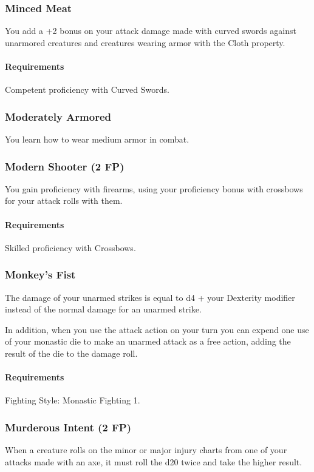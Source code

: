 \subsubsection{Minced Meat} \label{feat::mincedmeat}
    You add a +2 bonus on your attack damage made with curved swords against unarmored creatures and creatures wearing armor with the Cloth property.
    \paragraph{Requirements} Competent proficiency with Curved Swords.
\subsubsection{Moderately Armored} \label{feat::moderatelyarmored}
    You learn how to wear medium armor in combat.
\subsubsection{Modern Shooter (2 FP)} \label{feat::modernshooter}
    You gain proficiency with firearms, using your proficiency bonus with crossbows for your attack rolls with them.
    \paragraph{Requirements} Skilled proficiency with Crossbows.
\subsubsection{Monkey's Fist} \label{feat::monkeysfist}
    The damage of your unarmed strikes is equal to d4 + your Dexterity modifier instead of the normal damage for an unarmed strike.

    In addition, when you use the attack action on your turn you can expend one use of your monastic die to make an unarmed attack as a free action, adding the result of the die to the damage roll.
    \paragraph{Requirements} Fighting Style: Monastic Fighting 1.
\subsubsection{Murderous Intent (2 FP)} \label{feat::murderousintent}
    When a creature rolls on the minor or major injury charts from one of your attacks made with an axe, it must roll the d20 twice and take the higher result.
